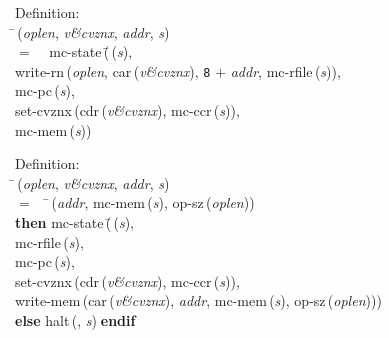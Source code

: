 \begin{tabbing}{\sc Definition}: \\  
\=\,({\it{oplen\/}}, {\it{v\&cvznx\/}}, {\it{addr\/}}, {\it{s\/}}) \\ 
$=$$\;\;\;\;${\rm{mc-state}}\,(\=\,({\it{s\/}}), \\ 
{\rm{write-rn}}\,({\it{oplen\/}}, {\rm{car}}\,({\it{v\&cvznx\/}}), {\tt{8}} $+$ {\it{addr\/}}, {\rm{mc-rfile}}\,({\it{s\/}})), \\ 
{\rm{mc-pc}}\,({\it{s\/}}), \\ 
{\rm{set-cvznx}}\,({\rm{cdr}}\,({\it{v\&cvznx\/}}), {\rm{mc-ccr}}\,({\it{s\/}})), \\ 
{\rm{mc-mem}}\,({\it{s\/}}))\-\-
\end{tabbing}

\begin{tabbing}{\sc Definition}: \\  
\=\,({\it{oplen\/}}, {\it{v\&cvznx\/}}, {\it{addr\/}}, {\it{s\/}}) \\ 
$=$$\;\;\;\;$\=\,({\it{addr\/}}, {\rm{mc-mem}}\,({\it{s\/}}), {\rm{op-sz}}\,({\it{oplen\/}})) \\ 
{\bf then }{\rm{mc-state}}\,(\=\,({\it{s\/}}), \\ 
{\rm{mc-rfile}}\,({\it{s\/}}), \\ 
{\rm{mc-pc}}\,({\it{s\/}}), \\ 
{\rm{set-cvznx}}\,({\rm{cdr}}\,({\it{v\&cvznx\/}}), {\rm{mc-ccr}}\,({\it{s\/}})), \\ 
{\rm{write-mem}}\,({\rm{car}}\,({\it{v\&cvznx\/}}), {\it{addr\/}}, {\rm{mc-mem}}\,({\it{s\/}}), {\rm{op-sz}}\,({\it{oplen\/}})))\- \\ 
{\bf else }{\rm{halt}}\,({}, {\it{s\/}})$\;${\bf  endif}\-\-
\end{tabbing}

